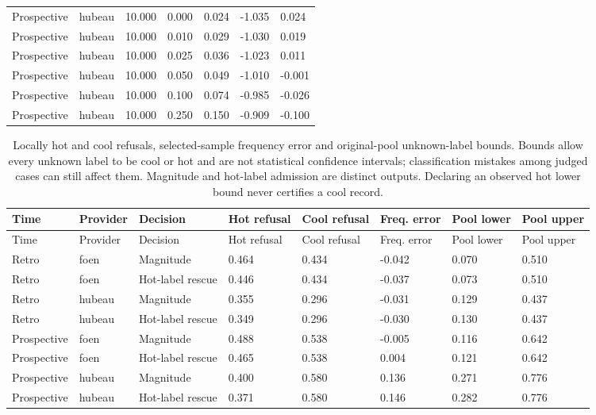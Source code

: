 {\begin{longtable}{p{}p{}p{}p{}p{}p{}p{}}
Prospective & hubeau & 10.000 & 0.000 & 0.024 & -1.035 & 0.024 \\
Prospective & hubeau & 10.000 & 0.010 & 0.029 & -1.030 & 0.019 \\
Prospective & hubeau & 10.000 & 0.025 & 0.036 & -1.023 & 0.011 \\
Prospective & hubeau & 10.000 & 0.050 & 0.049 & -1.010 & -0.001 \\
Prospective & hubeau & 10.000 & 0.100 & 0.074 & -0.985 & -0.026 \\
Prospective & hubeau & 10.000 & 0.250 & 0.150 & -0.909 & -0.100 \\
\bottomrule
\end{longtable}
}

{\tabletext
\setlength{\tabcolsep}{3pt}
\begin{longtable}{p{}p{}p{}p{}p{}p{}p{}p{}}
\caption{Locally hot and cool refusals, selected-sample frequency error and original-pool unknown-label bounds. Bounds allow every unknown label to be cool or hot and are not statistical confidence intervals; classification mistakes among judged cases can still affect them. Magnitude and hot-label admission are distinct outputs. Declaring an observed hot lower bound never certifies a cool record.}\label{tab:r3si-representation}\\
\toprule
Time & Provider & Decision & Hot refusal & Cool refusal & Freq. error & Pool lower & Pool upper \\
\midrule
\endfirsthead
\toprule
Time & Provider & Decision & Hot refusal & Cool refusal & Freq. error & Pool lower & Pool upper \\
\midrule
\endhead
Retro & foen & Magnitude & 0.464 & 0.434 & -0.042 & 0.070 & 0.510 \\
Retro & foen & Hot-label rescue & 0.446 & 0.434 & -0.037 & 0.073 & 0.510 \\
Retro & hubeau & Magnitude & 0.355 & 0.296 & -0.031 & 0.129 & 0.437 \\
Retro & hubeau & Hot-label rescue & 0.349 & 0.296 & -0.030 & 0.130 & 0.437 \\
Prospective & foen & Magnitude & 0.488 & 0.538 & -0.005 & 0.116 & 0.642 \\
Prospective & foen & Hot-label rescue & 0.465 & 0.538 & 0.004 & 0.121 & 0.642 \\
Prospective & hubeau & Magnitude & 0.400 & 0.580 & 0.136 & 0.271 & 0.776 \\
Prospective & hubeau & Hot-label rescue & 0.371 & 0.580 & 0.146 & 0.282 & 0.776 \\
\bottomrule
\end{longtable}
}
